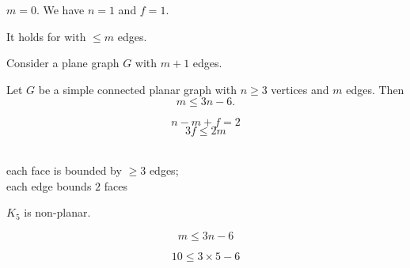 \begin{frame}{}
  \begin{center}

    \pause
    \vspace{0.30cm}
    \begin{description}
      \setlength{\itemsep}{8pt}
      \item[Basis Step:] $m = 0$. We have $n = 1$ and $f = 1$.
      \item[Induction Hypothesis:]
        It holds for  with $\le m$ edges.
      \item[Induction Step:] Consider a plane graph $G$ with $m+1$ edges. \\[5pt]
    \end{description}
  \end{center}
\end{frame}

\begin{frame}{}
  \begin{theorem}
    Let $G$ be a simple connected planar graph with $n \ge 3$ vertices
    and $m$ edges. Then
    \[
      m \le 3n -6.
    \]
  \end{theorem}

  \pause
  \[
    n - m + f = 2
  \]
  \pause
  \[
    3f \le 2m
  \]
  \pause
  \begin{center}
     \\[3pt]
    each face is bounded by $\ge 3$ edges; \\
    each edge bounds $2$ faces
  \end{center}
\end{frame}

\begin{frame}{}
  \begin{theorem}
    $K_{5}$ is non-planar.
  \end{theorem}

  \pause
  \[
    m \le 3n -6
  \]

  \pause
  \[
    10 \le 3 \times 5 - 6
  \]
\end{frame}

